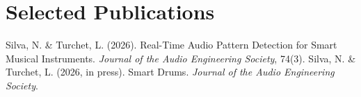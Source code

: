 \documentclass[11pt]{article}
\begin{document}
\section*{Selected Publications \footnotesize {}}
Silva, N. \& Turchet, L. (2026). Real-Time Audio Pattern Detection for Smart Musical Instruments. \textit{Journal of the Audio Engineering Society}, 74(3). Silva, N. \& Turchet, L. (2026, in press). Smart Drums. \textit{Journal of the Audio Engineering Society}.
\end{document}
